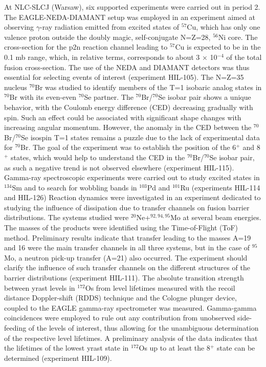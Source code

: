 At NLC-SLCJ (Warsaw), six supported experiments were carried out in period 2.  
The EAGLE-NEDA-DIAMANT setup was employed in an experiment aimed at observing $\gamma$-ray radiation emitted from excited states of $^{57}$Cu, which has only one valence proton outside the doubly magic, self-conjugate N=Z=28, $^{56}$Ni core. The cross-section for the p2n reaction channel leading to $^{57}$Cu is expected to be in the 0.1 mb range, which, in relative terms, corresponds to about 3 × 10$^{-4}$ of the total fusion cross-section. The use of the NEDA and DIAMANT detectors was thus essential for selecting events of interest (experiment HIL-105). 
The N=Z=35 nucleus $^{70}$Br was studied to identify members of the T=1 isobaric analog states in $^{70}$Br with its even-even $^{70}$Se partner. The $^{70}$Br/$^{70}$Se isobar pair shows a unique behavior, with the Coulomb energy difference (CED) decreasing gradually with spin. Such an effect could be associated with significant shape changes with increasing angular momentum. However, the anomaly in the CED between the $^{70}$Br/$^{70}$Se isospin T=1 states remains a puzzle due to the lack of experimental data for $^{70}$Br. The goal of the experiment was to establish the position of the 6$^+$ and 8$^+$ states, which would help to understand the CED in the $^{70}$Br/$^{70}$Se isobar pair, as such a negative trend is not observed elsewhere (experiment HIL-115). 
Gamma-ray spectroscopic experiments were carried out to study excited states in $^{134}$Sm and to search for wobbling bands in $^{103}$Pd and $^{101}$Ru (experiments HIL-114 and HIL-126)
Reaction dynamics were investigated in an experiment dedicated to studying the influence of dissipation due to transfer channels on fusion barrier distributions. The systems studied were $^{20}$Ne+$^{92,94,95}$Mo at several beam energies. The masses of the products were identified using the Time-of-Flight (ToF) method. Preliminary results indicate that transfer leading to the masses A=19 and 16 were the main transfer channels in all three systems, but in the case of $^{95}$Mo, a neutron pick-up transfer (A=21) also occurred. The experiment should clarify the influence of such transfer channels on the different structures of the barrier distributions (experiment HIL-111).
The absolute transition strength between yrast levels in $^{172}$Os from level lifetimes measured with the recoil distance Doppler-shift (RDDS) technique and the Cologne plunger device, coupled to the EAGLE gamma-ray spectrometer was measured. Gamma-gamma coincidences were employed to rule out any contribution from unobserved side-feeding of the levels of interest, thus allowing for the unambiguous determination of the respective level lifetimes. A preliminary analysis of the data indicates that the lifetimes of the lowest yrast state in $^{172}$Os up to at least the 8$^+$ state can be determined (experiment HIL-109).


